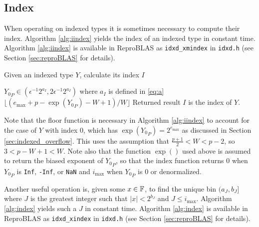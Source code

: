   \subsection{Index}
    \label{sec:primitiveops_index}
    When operating on indexed types it is sometimes necessary to compute their
    index. Algorithm \ref{alg:iindex} yields the index of an indexed type in
    constant time. Algorithm \ref{alg:iindex} is available in ReproBLAS as \texttt{idxd\_xmindex} in \texttt{idxd.h} (see Section \ref{sec:reproBLAS} for details).

    \begin{samepage}
    \begin{alg}
      Given an indexed type $Y$, calculate its index $I$
      \begin{algorithmic}[1]
        \Require
          \Statex ${Y_0}_P \in (\epsilon^{-1}  2^{a_{I}}, 2  \epsilon^{-1}  2^{a_I})$
          where $a_I$ is defined in \eqref{eq:a}
          \State \Return $\lfloor(e_{\max} + p - \exp({Y_0}_P) - W + 1)/W\rfloor$
        \EndFunction
        \Ensure
          \Statex Returned result $I$ is the index of $Y$.
      \end{algorithmic}
      \label{alg:iindex}
    \end{alg}
    \end{samepage}

    Note that the floor function is necessary in Algorithm \ref{alg:iindex} to
    account for the case of $Y$ with index $0$, which has $\exp({Y_0}_P) =
    2^{e_{\max}}$ as discussed in Section \ref{sec:indexed_overflow}.  This
    uses the assumption that $\frac{p+1}{2} < W < p-2$, so $3 < p - W + 1 < W.$ 
    Note also that the function $\exp()$ used above is assumed to return the biased exponent of ${Y_0}_P$, so that the index function returns 0 when ${Y_0}_P$ is \texttt{Inf}, \texttt{-Inf}, or \texttt{NaN} and $i_{\max}$ when ${Y_0}_P$ is 0 or denormalized.

    Another useful operation is, given some $x \in \mathbb{F}$, to find the unique bin
    $(a_J, b_J]$ where $J$ is the greatest integer such that $|x| < 2^{b_J}$ and $J \leq i_{\max}$.
    Algorithm \ref{alg:index} yields such a $J$ in constant time. Algorithm \ref{alg:index} is available in ReproBLAS as \texttt{idxd\_xindex} in \texttt{idxd.h} (see Section \ref{sec:reproBLAS} for details).


